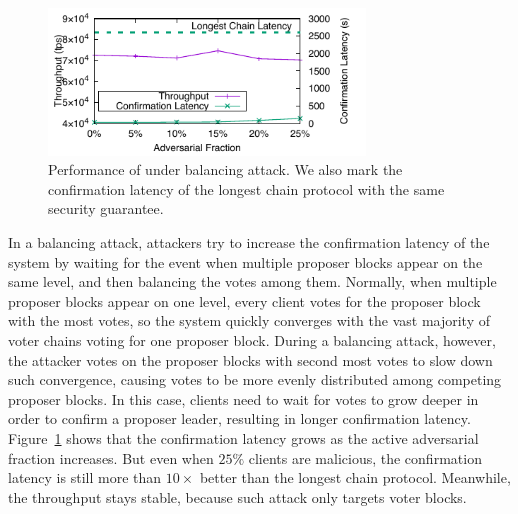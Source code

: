 \label{sec:balancing}

\begin{figure}
    \centering
    \includegraphics[width=0.75\textwidth]{figures/attack-fig-balancing.pdf}
    \caption[Performance of Prism under balancing attack.]{Performance of \prism under balancing attack. We also mark the confirmation latency of the longest chain protocol with the same security guarantee.}
    \label{fig:attack-balancing}
\end{figure}

In a balancing attack, attackers try to increase the confirmation latency of the system by waiting for the event when multiple proposer blocks appear on the same level, and then balancing the votes among them. Normally, when multiple proposer blocks appear on one level, every client votes for the proposer block with the most votes, so the system quickly converges with the vast majority of voter chains voting for one proposer block. During a balancing attack, however, the attacker votes on the proposer blocks with second most votes to slow down such convergence, causing votes to be more evenly distributed among competing proposer blocks. In this case, clients need to wait for votes to grow deeper in order to confirm a proposer leader, resulting in longer confirmation latency. Figure~\ref{fig:attack-balancing} shows that the confirmation latency grows as the active adversarial fraction increases. But even when $25\%$ clients are malicious, the confirmation latency is still more than $10\times$ better than the longest chain protocol. Meanwhile, the throughput stays stable, because such attack only targets voter blocks.

